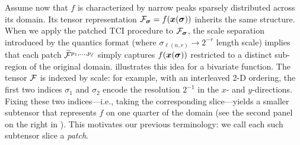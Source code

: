 Assume now that $f$ is characterized by narrow peaks sparsely distributed across its domain. Its tensor representation $\mathcal{F}_{\boldsymbol{\sigma}} = f(\boldsymbol{x}(\boldsymbol{\sigma}))$ inherits the same structure. When we apply the patched TCI procedure to $\mathcal{F}_{\boldsymbol{\sigma}}$, the scale separation introduced by the quantics format (where $\sigma_{\ell(n,r)} \to 2^{-r}$ length scale) implies that each patch $\widetilde{\mathcal{F}}^{p_1,\dots,p_{\bar \ell}}$ simply captures $f(\boldsymbol{x}(\boldsymbol{\sigma}))$ restricted to a distinct sub-region of the original domain.
 illustrates this idea for a bivariate function.
The tensor $\mathcal{F}$ is indexed by scale: for example, with an interleaved 2-D ordering, the first two indices $\sigma_1$ and $\sigma_2$ encode the resolution $2^{-1}$ in the $x$- and $y$-directions. Fixing these two indices—i.e., taking the corresponding slice—yields a smaller subtensor that represents $f$ on one quarter of the domain (see the second panel on the right in ). This motivates our previous terminology: we call each such subtensor slice a \textit{patch}.
